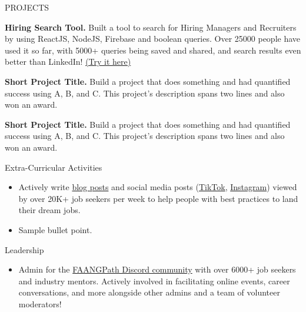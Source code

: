 \documentclass{resume} %
\begin{document}
	\begin{rSection}{PROJECTS}
		\vspace{-1.25em}
		\item \textbf{Hiring Search Tool.} {Built a tool to search for Hiring Managers and Recruiters by using ReactJS, NodeJS, Firebase and boolean queries. Over 25000 people have used it so far, with 5000+ queries being saved and shared, and search results even better than LinkedIn! \href{https://hiring-search.careerflow.ai/}{(Try it here)}}
		\item \textbf{Short Project Title.} {Build a project that does something and had quantified success using A, B, and C. This project's description spans two lines and also won an award.}
		\item \textbf{Short Project Title.} {Build a project that does something and had quantified success using A, B, and C. This project's description spans two lines and also won an award.}
	\end{rSection} 

	
	\begin{rSection}{Extra-Curricular Activities} 
		\begin{itemize}
			\item 	Actively write \href{https://www.faangpath.com/blog/}{blog posts} and social media posts (\href{https://www.tiktok.com/@faangpath}{TikTok}, \href{https://www.instagram.com/faangpath/?hl=en}{Instagram}) viewed by over 20K+ job seekers per week to help people with best practices to land their dream jobs. 
			\item	Sample bullet point.
		\end{itemize}
		
		
	\end{rSection}
	
	\begin{rSection}{Leadership} 
		\begin{itemize}
			\item Admin for the \href{https://discord.com/invite/WWbjEaZ}{FAANGPath Discord community} with over 6000+ job seekers and industry mentors. Actively involved in facilitating online events, career conversations, and more alongside other admins and a team of volunteer moderators! 
		\end{itemize}
		
		
	\end{rSection}
	
	
\end{document}
